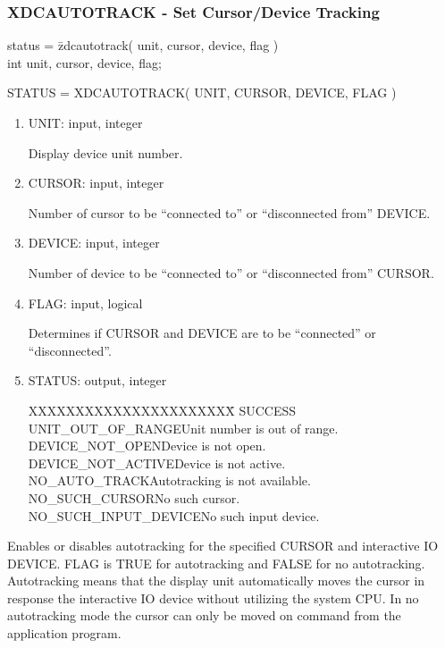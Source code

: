 \subsubsection{XDCAUTOTRACK - Set Cursor/Device Tracking}
\begin{tabbing}
status = \=zdcautotrack( unit, cursor, device, flag )\\
\>int  unit, cursor, device, flag;\\
\end{tabbing}
STATUS = XDCAUTOTRACK( UNIT, CURSOR, DEVICE, FLAG )
\begin{enumerate}
\item UNIT:  input, integer

Display device unit number.
\item CURSOR:  input, integer

Number of cursor to be ``connected to'' or ``disconnected from'' DEVICE.
\item DEVICE:  input, integer

Number of device to be ``connected to'' or ``disconnected from'' CURSOR.
\item FLAG:  input, logical

Determines if CURSOR and DEVICE are to be ``connected'' or
``disconnected''.
\item STATUS:  output, integer
\begin{tabbing}
XXXXXXXXXXXXXXXXXXXXXX\=\kill
SUCCESS\\
UNIT\_OUT\_OF\_RANGE\>Unit number is out of range.\\
DEVICE\_NOT\_OPEN\>Device is not open.\\
DEVICE\_NOT\_ACTIVE\>Device is not active.\\
NO\_AUTO\_TRACK\>Autotracking is not available.\\
NO\_SUCH\_CURSOR\>No such cursor.\\
NO\_SUCH\_INPUT\_DEVICE\>No such input device.\\
\end{tabbing}
\end{enumerate}
Enables or disables autotracking for the specified CURSOR and
interactive IO DEVICE.  FLAG is TRUE for autotracking and FALSE for
no autotracking.  Autotracking means that the display unit
automatically moves the cursor in response the interactive IO device
without utilizing the system CPU.  In no autotracking mode the
cursor can only be moved on command from the application program.
\newpage

